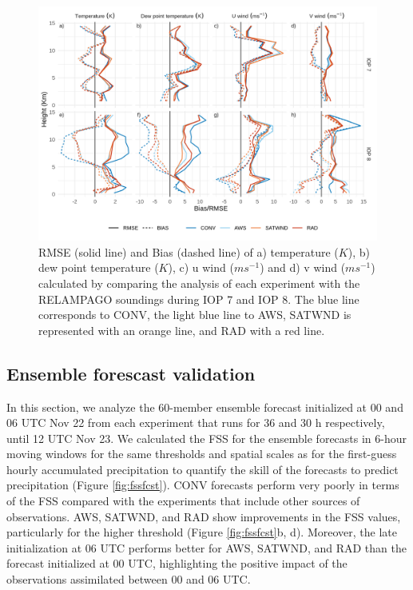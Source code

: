 \documentclass[authoryear,preprint,review,12pt]{elsarticle} %
\begin{document}
\begin{figure}[t]

{\centering \includegraphics{../figures/soundings-1} 

}

\caption{RMSE (solid line) and Bias (dashed line) of a) temperature (\(K\)), b) dew point temperature (\(K\)), c) u wind (\(ms^{-1}\)) and d) v wind (\(ms^{-1}\)) calculated by comparing the analysis of each experiment with the RELAMPAGO soundings during IOP 7 and IOP 8. The blue line corresponds to CONV, the light blue line to AWS, SATWND is represented with an orange line, and RAD with a red line.}\label{fig:soundings}
\end{figure}

\hypertarget{ensemble-forescast-validation}{%
\subsection{Ensemble forescast validation}\label{ensemble-forescast-validation}}

In this section, we analyze the 60-member ensemble forecast initialized at 00 and 06 UTC Nov 22 from each experiment that runs for 36 and 30 h respectively, until 12 UTC Nov 23. We calculated the FSS for the ensemble forecasts in 6-hour moving windows for the same thresholds and spatial scales as for the first-guess hourly accumulated precipitation to quantify the skill of the forecasts to predict precipitation (Figure \ref{fig:fssfcst}). CONV forecasts perform very poorly in terms of the FSS compared with the experiments that include other sources of observations. AWS, SATWND, and RAD show improvements in the FSS values, particularly for the higher threshold (Figure \ref{fig:fssfcst}b, d). Moreover, the late initialization at 06 UTC performs better for AWS, SATWND, and RAD than the forecast initialized at 00 UTC, highlighting the positive impact of the observations assimilated between 00 and 06 UTC.
\end{document}
